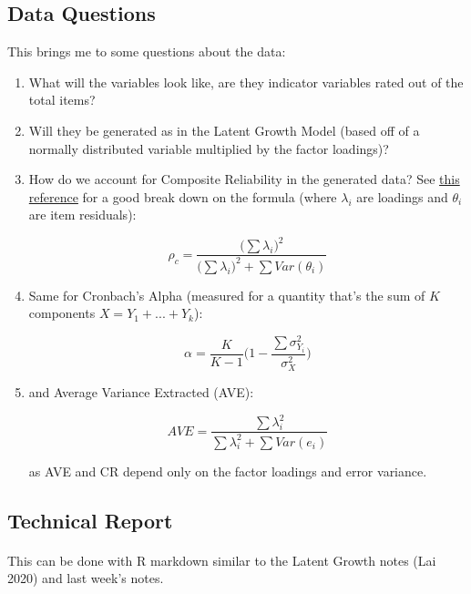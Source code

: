 \documentclass{article}
\begin{document}
\subsection{Data Questions}

This brings me to some questions about the data:

\begin{enumerate}

\item What will the variables look like, are they indicator variables rated out of the total items?

\item Will they be generated as in the Latent Growth Model (based off of a normally distributed variable multiplied by the factor loadings)?

\item How do we account for Composite Reliability in the generated data? See \href{https://dl.acm.org/doi/pdf/10.1145/2544415.2544417?download=true}{this reference} for a good break down on the formula (where $\lambda_i$ are loadings and $\theta_i$ are item residuals):

$$ \rho_c = \frac{\big( \sum \lambda_i \big)^2}{\big( \sum \lambda_i \big)^2 + \sum Var ( \theta_i )}$$

\item Same for Cronbach's Alpha (measured for a quantity that's the sum of $K$ components $X = Y_1 + ... + Y_k$):

$$ \alpha = \frac{K}{K - 1} \bigg( 1 - \frac{ \sum \sigma_{Y_i}^2}{\sigma_X^2} \bigg)$$

\item and Average Variance Extracted (AVE):

$$ AVE = \frac{\sum \lambda_i^2}{\sum \lambda_i^2 + \sum Var(e_i)} $$

as AVE and CR depend only on the factor loadings and error variance.

\end{enumerate}

\subsection{Technical Report}

\paragraph{}
This can be done with R markdown similar to the Latent Growth notes (Lai 2020) and last week's notes.
\end{document}
